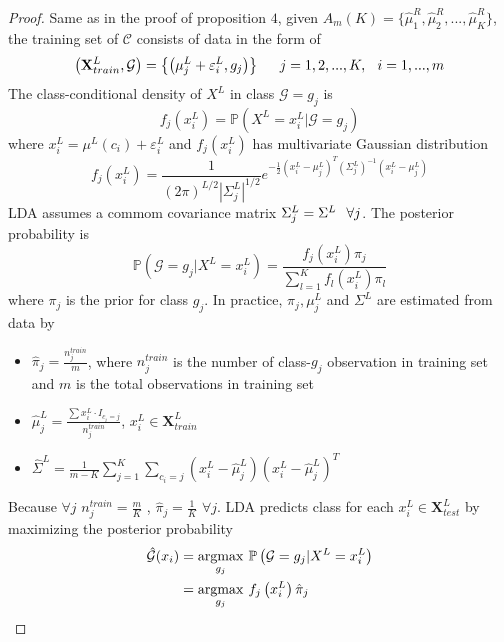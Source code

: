 \documentclass[11pt]{article}
\begin{document}
\begin{proof}
Same as in the proof of proposition $4$, given $A_m(K) = \{\hat{\mu}^R_1,\hat{\mu}^R_2,...,\hat{\mu}^R_K \}$, the training set of $\mathcal{C}$ consists of data in the form of 
\[ \left(\mathbf{X}^L_{train},\mathcal{G} \right) = \left\lbrace\left(\mu^L_{j} + \varepsilon^L_i, g_j \right)\right\rbrace\hspace{0.2in} j =1,2,...,K, \hspace{0.1in} i=1,...,m\]
The class-conditional density of $X^L$ in class $\mathcal{G} = g_j$ is $$f_j\left(x^L_i\right) = \mathbb{P}\left( X^L=x^L_i | \mathcal{G} = g_j \right) $$ where $x^L_i=\mu^L(c_i)+\varepsilon^L_i$ and $f_j\left(x^L_i\right)$ has multivariate Gaussian distribution
\[ f_j\left(x^L_i\right) = \frac{1}{(2\pi)^{L/2}|\Sigma^L_j|^{1/2}}e^{-\frac{1}{2}(x^L_i-\mu^L_j)^T(\Sigma^L_j)^{-1}(x^L_i-\mu^L_j)	}\]
LDA assumes a commom covariance matrix $\Sigma^L_j = \Sigma^L \hspace{0.1in} \forall j$.
The posterior probability is 
\[	\mathbb{P}\left( \mathcal{G} = g_j | X^L=x^L_i  \right)  = \frac{f_j\left(x^L_i\right) \pi_j}{\sum^K_{l=1}f_l\left(x^L_i\right) \pi_l}	\]
where $ \pi_j$ is the prior for class $g_j$. In practice, $\pi_j, \mu^L_j$ and $\Sigma^L$ are estimated from data by
 \begin{itemize}
 	\item  $\hat{\pi}_j = \frac{n^{train}_j}{m}$, where $n^{train}_j$ is the number of class-$g_j$ observation in training set and $m$ is the total observations in training set
 	\item  $\hat{\mu}^L_{j} = \frac{\sum x^L_i \cdot I_{c_i=j} }{n^{train}_j}$, $x^L_i  \in \mathbf{X}^L_{train}$
 	\item  $\hat{\Sigma}^L = \frac{1}{m-K} \sum^K_{j=1}\sum_{c_i=j} (x^L_i - \hat{\mu}^L_j )(x^L_i - \hat{\mu}^L_j )^T$
 \end{itemize}
Because $\forall j$ $n^{train}_j=\frac{m}{K}$ , $\hat{\pi}_j = \frac{1}{K}$ $\forall j$. LDA predicts class for each $x^L_i  \in \mathbf{X}^L_{test}$ by maximizing the posterior probability
\begin{align}
     \hat{\mathcal{G}}(x_i) & = \underset{g_j}{\operatorname{argmax}}\hspace{0.05 in} \mathbb{P}\left( \mathcal{G} = g_j | X^L=x^L_i  \right)  \nonumber   \\ 
     & = \underset{g_j}{\operatorname{argmax}}\hspace{0.05 in} f_j\left(x^L_i\right) \hat{\pi}_j \nonumber \nonumber  \\

\end{align}
\end{proof}
\end{document}
